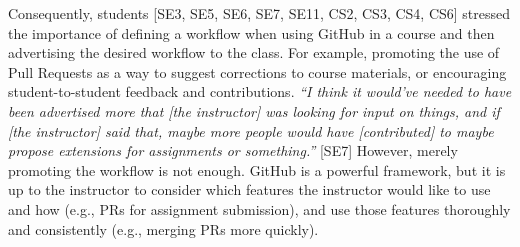 
Consequently, students [SE3, SE5, SE6, SE7, SE11, CS2, CS3, CS4, CS6] stressed the importance of defining a workflow when using GitHub in a course and then advertising the desired workflow to the class. For example, promoting the use of Pull Requests as a way to suggest corrections to course materials, or encouraging student-to-student feedback and contributions. \textit{``I think it would've needed to have been advertised more that [the instructor] was looking for input on things, and if [the instructor] said that, maybe more people would have [contributed] to maybe propose extensions for assignments or something.''} [SE7] However, merely promoting the workflow is not enough. GitHub is a powerful framework, but it is up to the instructor to consider which features the instructor would like to use and how (e.g., PRs for assignment submission), and use those features thoroughly and consistently (e.g., merging PRs more quickly).


